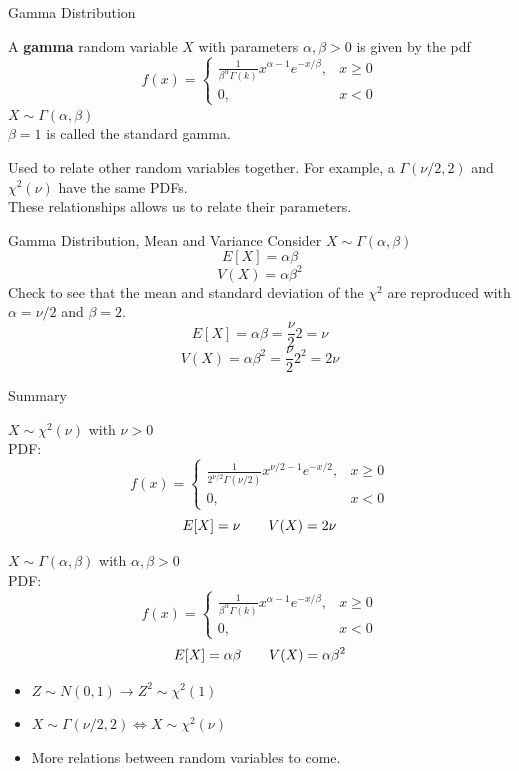 \documentclass[handout]{beamer}
\newcommand{\nl}[1]{\vspace{#1 em}}
\begin{document}
\begin{frame}{Gamma Distribution}
    \begin{block}{}
        A \textbf{gamma} random variable $X$ with parameters $\alpha,\beta>0$ is given by the pdf
        $$f(x) = \begin{cases}\frac{1}{\beta^\alpha\Gamma(k)}x^{\alpha-1}e^{-x/\beta}, & x\geq 0 \\ 0, & x<0\end{cases}$$
        $X\sim \Gamma(\alpha,\beta)$ \\ \nl{0.5}
        $\beta=1$ is called the standard gamma.
    \end{block}
    Used to relate other random variables together. For example, a $\Gamma(\nu/2,2)$ and $\chi^2(\nu)$ have the same PDFs.
    \\ \nl{0.5}
    These relationships allows us to relate their parameters.
\end{frame}
\begin{frame}{Gamma Distribution, Mean and Variance}
Consider $X \sim \Gamma(\alpha,\beta)$
$$ E[X] = \alpha\beta $$
$$ V(X) = \alpha\beta^2 $$
\pause Check to see that the mean and standard deviation of the $\chi^2$ are reproduced with $\alpha=\nu/2$ and $\beta = 2$.
\pause $$E[X] = \alpha\beta = \frac{\nu}{2} 2 = \nu$$
\pause $$ V(X) = \alpha\beta^2 = \frac{\nu}{2} 2^2 = 2 \nu$$
\vfill
\end{frame}
\begin{frame}{Summary}
    \begin{block}{}
        $X \sim \chi^2(\nu)$ with $\nu>0$\\
        PDF:
    $$f(x) = \begin{cases}\frac1{2^{\nu/2}\Gamma(\nu/2)}x^{\nu/2-1}e^{-x/2},& x\geq 0 \\ 0, & x<0\end{cases}$$
        $$ E[X]  = \nu \hskip 2em V(X) = 2\nu $$
    \end{block}
    \begin{block}{}
        $X \sim \Gamma(\alpha,\beta)$ with $\alpha,\beta>0$\\
        PDF:
    $$f(x) = \begin{cases}\frac{1}{\beta^\alpha\Gamma(k)}x^{\alpha-1}e^{-x/\beta}, & x\geq 0 \\ 0, & x<0\end{cases}$$
        $$ E[X]  = \alpha\beta \hskip 2em V(X) = \alpha\beta^2 $$
    \end{block}
    \begin{itemize}
        \item $Z\sim N(0,1) \to Z^2 \sim \chi^2(1)$
        \item $X\sim \Gamma(\nu/2,2)  \iff X \sim \chi^2(\nu)$
        \item More relations between random variables to come.
    \end{itemize}
\end{frame}
\end{document}
